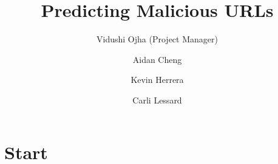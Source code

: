 \documentclass[cs]{hmcclinic}
\title{Predicting Malicious URLs}
\author{Vidushi Ojha (Project Manager) \and Aidan Cheng \and Kevin Herrera \and Carli Lessard}
\begin{document}

\maketitle

\tableofcontents








\newpage


\chapter{Start}
\end{document}
